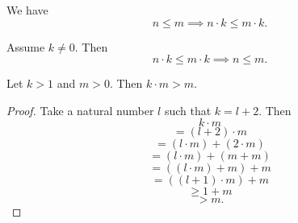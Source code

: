 \documentclass[../../natural-numbers.ftl.tex]{subfiles}
\begin{document}
\begin{forthel}
    \begin{corollary}[NN 02 03 419208]
      We have \[ n \leq m \implies n \cdot k \leq m \cdot k. \]
    \end{corollary}

    \begin{corollary}[NN 02 03 582576]
      Assume $k \neq 0$.
      Then \[ n \cdot k \leq m \cdot k \implies n \leq m. \]
    \end{corollary}

    \begin{proposition}[NN 02 03 252473]
      Let $k > 1$ and $m > 0$.
      Then $k \cdot m > m$.
    \end{proposition}
    \begin{proof}
      Take a natural number $l$ such that $k = l + 2$.
      Then
      \[      k \cdot m \]
      \[ =    (l + 2) \cdot m \]
      \[ =    (l \cdot m) + (2 \cdot m) \]
      \[ =    (l \cdot m) + (m + m) \]
      \[ =    ((l \cdot m) + m) + m \]
      \[ =    ((l + 1) \cdot m) + m \]
      \[ \geq 1 + m \]
      \[ >    m. \]
    \end{proof}
  \end{forthel}
\end{document}
